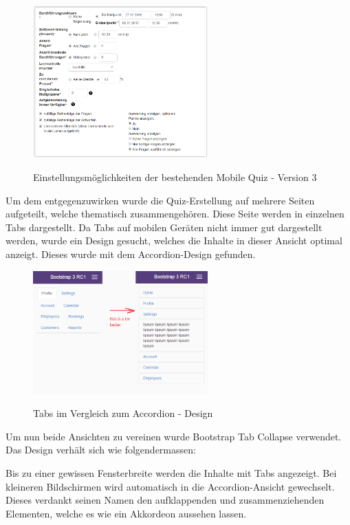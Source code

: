 \begin{figure}[H]
	\centering
	\includegraphics[width=0.6\textwidth]{Images/Einstellungen_alt.PNG}
	\caption{Einstellungsmöglichkeiten der bestehenden Mobile Quiz - Version 3}
	\cite{mobilequiz.ch}
\end{figure}


Um dem entgegenzuwirken wurde die Quiz-Erstellung auf mehrere Seiten aufgeteilt, welche thematisch zusammengehören. Diese Seite werden in einzelnen Tabs dargestellt. Da Tabs auf mobilen Geräten nicht immer gut dargestellt werden, wurde ein Design gesucht, welches die Inhalte in dieser Ansicht optimal anzeigt. Dieses wurde mit dem Accordion-Design gefunden.


\begin{figure}[H]
	\centering
	\includegraphics[width=0.6\textwidth]{Images/Bootstrap_Accordion.png}
	\caption{Tabs im Vergleich zum Accordion - Design}
	\cite{tabs_accodion}
\end{figure}

Um nun beide Ansichten zu vereinen wurde \glqq Bootstrap Tab Collapse\grqq \cite{bootstrap-tabcollapse} verwendet. Das Design verhält sich wie folgendermassen:

Bis zu einer gewissen Fensterbreite werden die Inhalte mit Tabs angezeigt. Bei kleineren Bildschirmen wird automatisch in die Accordion-Ansicht gewechselt. Dieses verdankt seinen Namen den aufklappenden und zusammenziehenden Elementen, welche es wie ein Akkordeon aussehen lassen.


